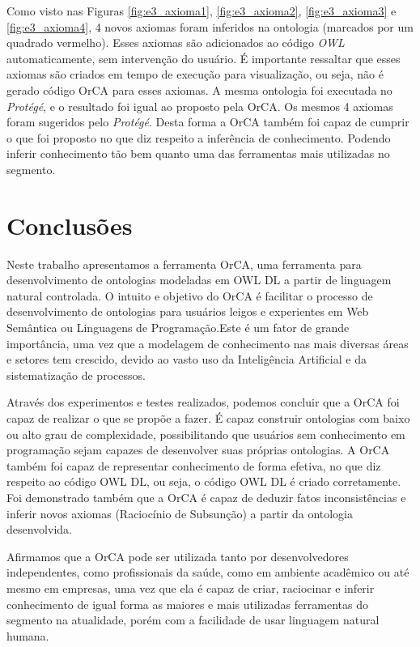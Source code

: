 \documentclass{bcc}
\begin{document}
Como visto nas Figuras \ref{fig:e3_axioma1}, \ref{fig:e3_axioma2}, \ref{fig:e3_axioma3} e \ref{fig:e3_axioma4}, 4 novos axiomas foram inferidos na ontologia (marcados por um quadrado vermelho). Esses axiomas são adicionados ao código \textit{OWL} automaticamente, sem intervenção do usuário. É importante ressaltar que esses axiomas são criados em tempo de execução para visualização, ou seja, não é gerado código OrCA para esses axiomas. A mesma ontologia foi executada no \textit{Protégé}, e o resultado foi igual ao proposto pela OrCA. Os mesmos 4 axiomas foram sugeridos pelo \textit{Protégé}. Desta forma a OrCA também foi capaz de cumprir o que foi proposto no que diz respeito a inferência de conhecimento. Podendo inferir conhecimento tão bem quanto uma das ferramentas mais utilizadas no segmento.

\chapter{Conclusões}
\label{chap:conclusao}

Neste trabalho apresentamos a ferramenta OrCA, uma ferramenta para desenvolvimento de ontologias modeladas em OWL DL a partir de linguagem natural controlada. O intuito e objetivo do OrCA é  facilitar o processo de desenvolvimento de ontologias para usuários leigos e experientes em Web Semântica ou Linguagens de Programação.Este é um fator de grande importância, uma vez que a modelagem de conhecimento nas mais diversas áreas e setores tem crescido, devido ao vasto uso da Inteligência Artificial e da sistematização de processos.

Através dos experimentos e testes realizados, podemos concluir que a OrCA foi capaz de realizar o que se propõe a fazer. É capaz construir ontologias com baixo ou alto grau de complexidade, possibilitando que usuários sem conhecimento em programação sejam capazes de desenvolver suas próprias ontologias. A OrCA também foi capaz de representar conhecimento de forma efetiva, no que diz respeito ao código OWL DL, ou seja, o código OWL DL é criado corretamente. Foi demonstrado também que a OrCA é capaz de deduzir fatos inconsistências e inferir novos axiomas (Raciocínio de Subsunção) a partir da ontologia desenvolvida.

Afirmamos que a OrCA pode ser utilizada tanto por desenvolvedores independentes, como profissionais da saúde, como em ambiente acadêmico ou até mesmo em empresas, uma vez que ela é capaz de criar, raciocinar e inferir conhecimento de igual forma as maiores e mais utilizadas ferramentas do segmento na atualidade, porém com a facilidade de usar linguagem natural humana.
\end{document}
